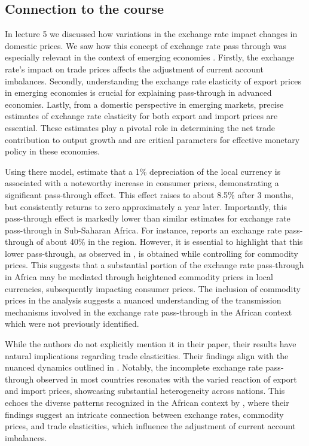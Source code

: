 \documentclass[11pt]{article}
\begin{document}
\begin{spacing}{2}
		\section{Connection to the course}
		In lecture 5 we discussed how variations in the exchange rate impact changes in domestic prices. We saw how this concept of exchange rate pass through was especially relevant in the context of emerging economies \parencite{bussiere2013exchange}. Firstly, the exchange rate's impact on trade prices affects the adjustment of current account imbalances. Secondly, understanding the exchange rate elasticity of export prices in emerging economies is crucial for explaining pass-through in advanced economies. Lastly, from a domestic perspective in emerging markets, precise estimates of exchange rate elasticity for both export and import prices are essential. These estimates play a pivotal role in determining the net trade contribution to output growth and are critical parameters for effective monetary policy in these economies.
		
		Using there model, \cite{lemaire2023international} estimate that a 1\% depreciation of the local currency is associated with a noteworthy increase in consumer prices, demonstrating a significant pass-through effect. This effect raises to about 8.5\% after 3 months, but consistently returns to zero approximately a year later. Importantly, this pass-through effect is markedly lower than similar estimates for exchange rate pass-through in Sub-Saharan Africa. For instance, \cite{razafimahefa2012exchange} reports an exchange rate pass-through of about 40\% in the region. However, it is essential to highlight that this lower pass-through, as observed in \cite{lemaire2023international}, is obtained while controlling for commodity prices. This suggests that a substantial portion of the exchange rate pass-through in Africa may be mediated through heightened commodity prices in local currencies, subsequently impacting consumer prices. The inclusion of commodity prices in the analysis suggests a nuanced understanding of the transmission mechanisms involved in the exchange rate pass-through in the African context which were not previously identified.
		
		While the authors do not explicitly mention it in their paper, their results have natural implications regarding trade elasticities. Their findings \cite{lemaire2023international} align with the nuanced dynamics outlined in \cite{bussiere2020global}. Notably, the incomplete exchange rate pass-through observed in most countries resonates with the varied reaction of export and import prices, showcasing substantial heterogeneity across nations. This echoes the diverse patterns recognized in the African context by \cite{lemaire2023international}, where their findings suggest an intricate connection between exchange rates, commodity prices, and trade elasticities, which influence the adjustment of current account imbalances. 
		

\end{spacing}
\end{document}
